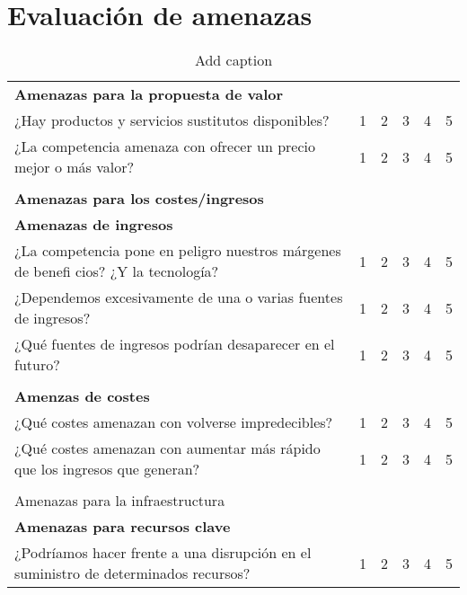 \documentclass[11pt]{book}
\begin{document}
\section{Evaluación de amenazas}
\begin{table}[htbp]
  \centering
  \caption{Add caption}
    \begin{tabular}{p{26.145em}ccccc}
    \textcolor[rgb]{ 1,  0,  0}{\textbf{Amenazas para la propuesta de valor}} &       &       &       &       &  \\
    ¿Hay productos y servicios sustitutos disponibles? & 1     & 2     & 3     & 4     & 5 \\
    ¿La competencia amenaza con ofrecer un precio mejor o más valor? & 1     & 2     & 3     & 4     & 5 \\
    \multicolumn{1}{l}{} &       &       &       &       &  \\
    \textcolor[rgb]{ 1,  0,  0}{\textbf{Amenazas para los costes/ingresos}} &       &       &       &       &  \\
    \textbf{Amenazas de ingresos} &       &       &       &       &  \\
    ¿La competencia pone en peligro nuestros márgenes de benefi cios? ¿Y la tecnología? & 1     & 2     & 3     & 4     & 5 \\
    ¿Dependemos excesivamente de una o varias fuentes de ingresos? & 1     & 2     & 3     & 4     & 5 \\
    ¿Qué fuentes de ingresos podrían desaparecer en el futuro? & 1     & 2     & 3     & 4     & 5 \\
    \multicolumn{1}{l}{} &       &       &       &       &  \\
    \textbf{Amenzas de costes} &       &       &       &       &  \\
    ¿Qué costes amenazan con volverse impredecibles? & 1     & 2     & 3     & 4     & 5 \\
    ¿Qué costes amenazan con aumentar más rápido que los ingresos que generan? & 1     & 2     & 3     & 4     & 5 \\
    \multicolumn{1}{l}{} &       &       &       &       &  \\
    \textcolor[rgb]{ 1,  0,  0}{Amenazas para la infraestructura} &       &       &       &       &  \\
    \textbf{Amenazas para recursos clave} &       &       &       &       &  \\
    ¿Podríamos hacer frente a una disrupción en el suministro de determinados recursos? & 1     & 2     & 3     & 4     & 5 \\

\end{tabular}
\end{table}
\end{document}
